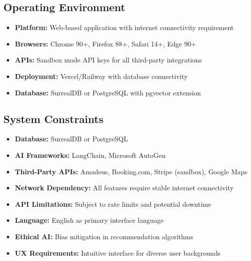 \documentclass[12pt,a4paper]{article}
\begin{document}
\subsection{Operating Environment}

\begin{itemize}[leftmargin=*, itemsep=0.3em]
    \item \textbf{Platform:} Web-based application with internet connectivity requirement
    \item \textbf{Browsers:} Chrome 90+, Firefox 88+, Safari 14+, Edge 90+
    \item \textbf{APIs:} Sandbox mode API keys for all third-party integrations
    \item \textbf{Deployment:} Vercel/Railway with database connectivity
    \item \textbf{Database:} SurrealDB or PostgreSQL with pgvector extension
\end{itemize}

\subsection{System Constraints}

\begin{infobox}
\begin{itemize}[leftmargin=*, itemsep=0.3em]
    \item \textbf{Database:} SurrealDB or PostgreSQL
    \item \textbf{AI Frameworks:} LangChain, Microsoft AutoGen
    \item \textbf{Third-Party APIs:} Amadeus, Booking.com, Stripe (sandbox), Google Maps
    \item \textbf{Network Dependency:} All features require stable internet connectivity
    \item \textbf{API Limitations:} Subject to rate limits and potential downtime
\end{itemize}
\end{infobox}

\begin{infobox}
\begin{itemize}[leftmargin=*, itemsep=0.3em]
    \item \textbf{Language:} English as primary interface language
    \item \textbf{Ethical AI:} Bias mitigation in recommendation algorithms
    \item \textbf{UX Requirements:} Intuitive interface for diverse user backgrounds
\end{itemize}
\end{infobox}
\end{document}
